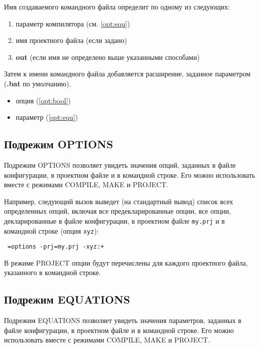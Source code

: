 Имя создаваемого командного файла \xds{} определит по одному из следующих:
\begin{enumerate}
\item параметр компилятора  (см. \ref{opt:equ})
\item имя проектного файла (если задано)
\item {\bf out} (если имя не определено выше указанными способами)
\end{enumerate}

Затем к имени командного файла добавляется расширение, заданное
параметром 
({\bf .bat} по умолчанию).

\Seealso
\begin{itemize}
\item опция    (\ref{opt:bool})
\item параметр  (\ref{opt:equ})
\end{itemize}

\subsection{Подрежим OPTIONS}\label{xc:modes:options}

Подрежим OPTIONS позволяет увидеть значения опций, заданных
в файле конфигурации, в проектном файле и в командной строке.
Его можно использовать вместе с режимами COMPILE, MAKE и PROJECT.

Например, следующий вызов выведет (на стандартный вывод) список
всех определенных опций, включая все предекларированные опции,
все опции, декларированные в файле конфигурации, в проектном файле
{\tt my.prj} и в командной строке (опция {\tt xyz}):
\begin{flushleft} \tt
\xc{} =options -prj=my.prj -xyz:+
\end{flushleft}

В режиме PROJECT опции будут перечислены для каждого проектного файла,
указанного в командной строке.

\subsection{Подрежим EQUATIONS}\label{xc:modes:equations}

Подрежим EQUATIONS позволяет увидеть значения параметров, заданных
в файле конфигурации, в проектном файле и в командной строке.
Его можно использовать вместе с режимами COMPILE, MAKE и PROJECT.

